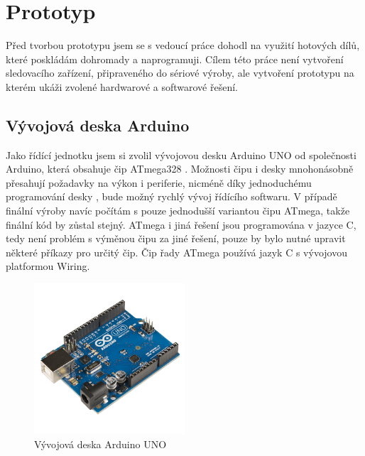 \documentclass[FM,MP]{tulthesis}  %
\begin{document}

\chapter{Prototyp}
Před tvorbou prototypu jsem se s vedoucí práce dohodl na využití hotových dílů, které poskládám dohromady a naprogramuji. Cílem této práce není vytvoření sledovacího zařízení, připraveného do sériové výroby, ale vytvoření prototypu na kterém ukáži zvolené hardwarové a softwarové řešení.

\section{Vývojová deska Arduino}
Jako řídící jednotku jsem si zvolil vývojovou desku Arduino UNO \cite{Arduino schematic} od společnosti Arduino, která obsahuje čip ATmega328 \cite{Atmega datasheet}. Možnosti čipu i desky mnohonásobně přesahují požadavky na výkon i periferie, nicméně díky jednoduchému programování desky \cite{Pruvodce arduinem}, bude možný rychlý vývoj řídícího softwaru. V případě finální výroby navíc počítám s pouze jednodušší variantou čipu ATmega, takže finální kód by zůstal stejný. ATmega i jiná řešení jsou programována v jazyce C, tedy není problém s výměnou čipu za jiné řešení, pouze by bylo nutné upravit některé příkazy pro určitý čip. Čip řady ATmega používá jazyk C s vývojovou platformou Wiring.

\begin{figure}[H]
\begin{center}
\includegraphics[width=0.5\textwidth]{images/arduino.png}
\caption{Vývojová deska Arduino UNO}
\label{image}
\end{center}
\end{figure}
\end{document}

